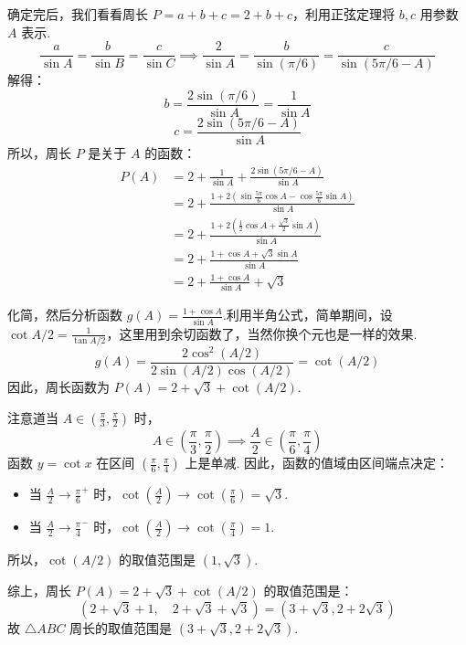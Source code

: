 \begin{prob-sol}
确定完后，我们看看周长 $P = a+b+c = 2+b+c$，利用正弦定理将 $b,c$ 用参数 $A$ 表示.
\[
\frac{a}{\sin A} = \frac{b}{\sin B} = \frac{c}{\sin C} \implies \frac{2}{\sin A} = \frac{b}{\sin(\pi/6)} = \frac{c}{\sin(5\pi/6 - A)}
\]
解得：
\[
b = \frac{2\sin(\pi/6)}{\sin A} = \frac{1}{\sin A}
\]
\[
c = \frac{2\sin(5\pi/6 - A)}{\sin A}
\]
所以，周长 $P$ 是关于 $A$ 的函数：
\begin{align*}
	P(A) &= 2 + \frac{1}{\sin A} + \frac{2\sin(5\pi/6 - A)}{\sin A} \\
	&= 2 + \frac{1 + 2\left(\sin\frac{5\pi}{6}\cos A - \cos\frac{5\pi}{6}\sin A\right)}{\sin A} \\
	&= 2 + \frac{1 + 2\left(\frac{1}{2}\cos A + \frac{\sqrt{3}}{2}\sin A\right)}{\sin A} \\
	&= 2 + \frac{1 + \cos A + \sqrt{3}\sin A}{\sin A} \\
	&= 2 + \frac{1+\cos A}{\sin A} + \sqrt{3}
\end{align*}

化简，然后分析函数 $g(A) = \frac{1+\cos A}{\sin A}$.利用半角公式，简单期间，设$\cot A/2 = \frac{1}{\tan A/2}$，这里用到余切函数了，当然你换个元也是一样的效果.
\[
g(A) = \frac{2\cos^2(A/2)}{2\sin(A/2)\cos(A/2)} = \cot(A/2)
\]
因此，周长函数为 $P(A) = 2 + \sqrt{3} + \cot(A/2)$.

注意道当 $A \in (\frac{\pi}{3}, \frac{\pi}{2})$ 时，
\[
A \in \left(\frac{\pi}{3}, \frac{\pi}{2}\right) \implies \frac{A}{2} \in \left(\frac{\pi}{6}, \frac{\pi}{4}\right)
\]
函数 $y = \cot x$ 在区间 $(\frac{\pi}{6}, \frac{\pi}{4})$ 上是单减.
因此，函数的值域由区间端点决定：
\begin{itemize}
	\item 当 $\frac{A}{2} \to \frac{\pi}{6}^+$ 时，$\cot(\frac{A}{2}) \to \cot(\frac{\pi}{6}) = \sqrt{3}$.
	\item 当 $\frac{A}{2} \to \frac{\pi}{4}^-$ 时，$\cot(\frac{A}{2}) \to \cot(\frac{\pi}{4}) = 1$.
\end{itemize}
所以，$\cot(A/2)$ 的取值范围是 $(1, \sqrt{3})$.

综上，周长 $P(A) = 2+\sqrt{3} + \cot(A/2)$ 的取值范围是：
\[
\left(2+\sqrt{3} + 1, \quad 2+\sqrt{3} + \sqrt{3}\right) = \left(3+\sqrt{3}, 2+2\sqrt{3}\right)
\]
故 $\triangle ABC$ 周长的取值范围是 $(3+\sqrt{3}, 2+2\sqrt{3})$.\hfill\qedsymbol
\end{prob-sol}

